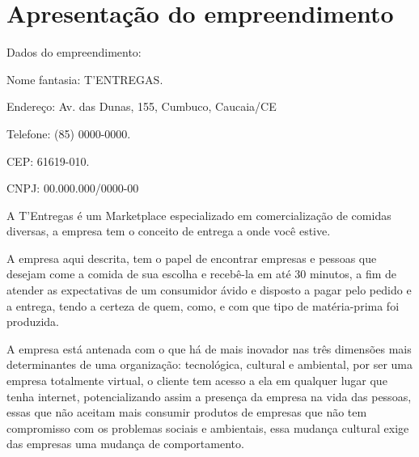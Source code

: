 \section{\textbf{Apresentação do empreendimento}}
\label{sec: empreendimento}

\begin{commentA}
	
	\par \end{commentA}

\begin{commentB}
	
	\par \end{commentB}


\noindent Dados do empreendimento:\par
\noindent Nome fantasia: T'ENTREGAS.\par
\noindent Endereço: Av. das Dunas, 155, Cumbuco, Caucaia/CE\par
\noindent Telefone: (85) 0000-0000.\par
\noindent CEP: 61619-010.\par
\noindent CNPJ: 00.000.000/0000-00 \par

A T'Entregas é um Marketplace especializado em comercialização 
de comidas diversas, a empresa tem o conceito de entrega a onde você estive.\par

A empresa aqui descrita, tem o papel de encontrar empresas e pessoas que 
desejam come a comida de sua escolha e recebê-la em até 30 minutos, a fim de atender as expectativas de um consumidor ávido e disposto a pagar 
pelo pedido e a entrega, tendo a certeza de quem, como, e com que tipo de 
matéria-prima foi produzida. \par

A empresa está antenada com o que há de mais inovador nas três dimensões mais determinantes de uma organização: tecnológica, cultural e ambiental, por ser uma empresa totalmente virtual, o cliente tem acesso a ela em qualquer lugar que tenha internet, potencializando assim a presença da empresa na vida das pessoas, essas que não aceitam mais consumir produtos de empresas que não tem compromisso com os problemas sociais e ambientais, essa mudança cultural exige das empresas uma mudança de comportamento. \par

